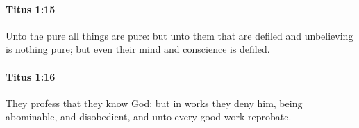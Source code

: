 		\paragraph{Titus 1:15} %
			\label{TITUS-1-15}

			Unto the pure all things are pure: but unto them that are defiled and unbelieving is nothing pure; but even their mind and conscience is defiled.

			\begin{framed}
			\scriptsize
				\begin{compactdesc}
					\item[SBLG] 
				\end{compactdesc}
			\end{framed}

		\paragraph{Titus 1:16} %
			\label{TITUS-1-16}

			They profess that they know God; but in works they deny him, being abominable, and disobedient, and unto every good work reprobate.

